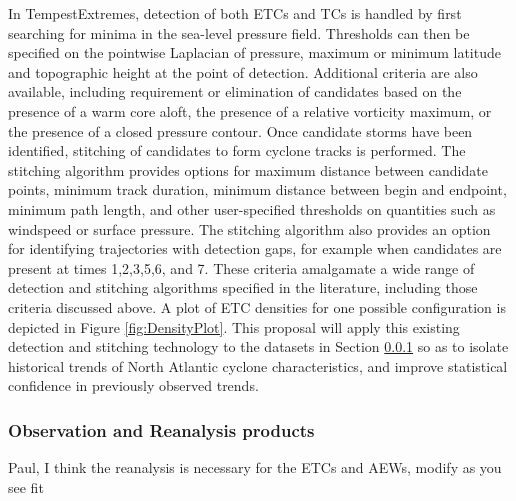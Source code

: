 \documentclass[11pt]{article}
\begin{document}
In TempestExtremes, detection of both ETCs and TCs is handled by first searching for minima in the sea-level pressure field.  Thresholds can then be specified on the pointwise Laplacian of pressure, maximum or minimum latitude and topographic height at the point of detection.  Additional criteria are also available, including requirement or elimination of candidates based on the presence of a warm core aloft, the presence of a relative vorticity maximum, or the presence of a closed pressure contour.  Once candidate storms have been identified, stitching of candidates to form cyclone tracks is performed.  The stitching algorithm provides options for maximum distance between candidate points, minimum track duration, minimum distance between begin and endpoint, minimum path length, and other user-specified thresholds on quantities such as windspeed or surface pressure.  The stitching algorithm also provides an option for identifying trajectories with detection gaps, for example when candidates are present at times 1,2,3,5,6, and 7.  These criteria amalgamate a wide range of detection and stitching algorithms specified in the literature, including those criteria discussed above.  A plot of ETC densities for one possible configuration is depicted in Figure \ref{fig:DensityPlot}.  This proposal will apply this existing detection and stitching technology to the datasets in Section \ref{sec:Datasets} so as to isolate historical trends of North Atlantic cyclone characteristics, and improve statistical confidence in previously observed trends.

\subsubsection{Observation and Reanalysis products}\label{sec:Datasets}

{\color{red} Paul, I think the reanalysis is necessary for the ETCs and AEWs, modify as you see fit}
\end{document}
